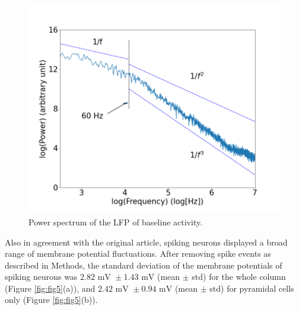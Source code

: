 \begin{figure}[H]
    \centering
    \includegraphics[scale=0.25]{Figures/Fig4.png}
    \caption{Power spectrum of the LFP of baseline activity.}
    \label{fig:LFP}
\end{figure}

Also in agreement with the original article, spiking neurons displayed a broad range of membrane potential fluctuations. After removing spike events as described in Methods, the standard deviation of the membrane potentials of spiking neurons was $2.82 \text{ mV } \pm 1.43 \text{ mV}$ (mean $\pm$ std) for the whole column (Figure \ref{fig:fig5}(a)), and $2.42 \text { mV } \pm 0.94 \text{ mV}$ (mean $\pm$ std) for pyramidal cells only (Figure \ref{fig:fig5}(b)).

